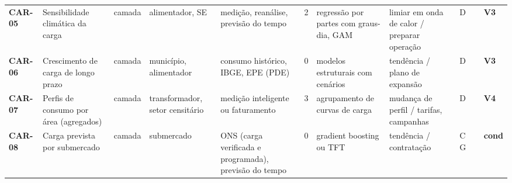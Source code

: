 {\begin{longtable}{@{}P{1.35cm}P{4.1cm}P{1.3cm}P{3.1cm}P{3.7cm}C{0.6cm}P{3.6cm}P{3.3cm}P{1.1cm}P{0.9cm}P{1.1cm}@{}}
\textbf{CAR-05} & Sensibilidade climática da carga & camada & alimentador, SE & medição, reanálise, previsão do tempo & 2 & regressão por partes com graus-dia, GAM & limiar em onda de calor / preparar operação & D &  & \colorbox{fV3}{\scriptsize \textbf{V3}} \\
\textbf{CAR-06} & Crescimento de carga de longo prazo & camada & município, alimentador & consumo histórico, IBGE, EPE (PDE) & 0 & modelos estruturais com cenários & tendência / plano de expansão & D &  & \colorbox{fV3}{\scriptsize \textbf{V3}} \\
\textbf{CAR-07} & Perfis de consumo por área (agregados) & camada & transformador, setor censitário & medição inteligente ou faturamento & 3 & agrupamento de curvas de carga & mudança de perfil / tarifas, campanhas & D &  & \colorbox{fV4}{\scriptsize \textbf{V4}} \\
\textbf{CAR-08} & Carga prevista por submercado & camada & submercado & ONS (carga verificada e programada), previsão do tempo & 0 & gradient boosting ou TFT & tendência / contratação & C G &  & \colorbox{fCond}{\scriptsize \textbf{cond}} \\
\bottomrule
\end{longtable}}

